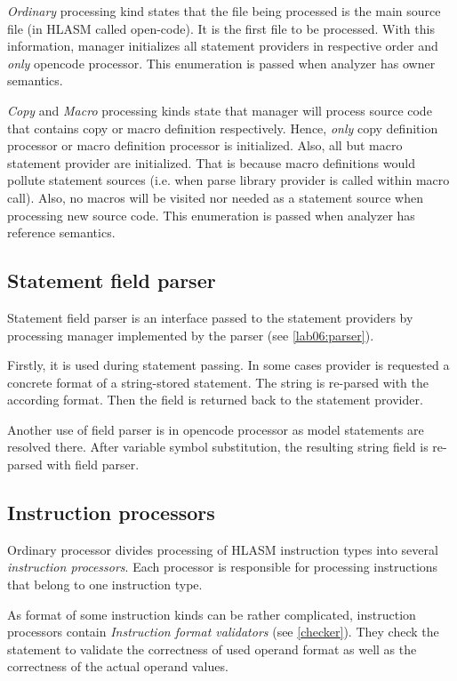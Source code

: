 \emph{Ordinary} processing kind states that the file being processed is the main source file (in HLASM called open-code). It is the first file to be processed. With this information, manager initializes all statement providers in respective order and \emph{only} opencode processor. This enumeration is passed when analyzer has owner semantics.

\emph{Copy} and \emph{Macro} processing kinds state that manager will process source code that contains copy or macro definition respectively. Hence, \emph{only} copy definition processor or macro definition processor is initialized. Also, all but macro statement provider are initialized. That is because macro definitions would pollute statement sources (i.e. when parse library provider is called within macro call). Also, no macros will be visited nor needed as a statement source when processing new source code. This enumeration is passed when analyzer has reference semantics.


\subsection{Statement field parser}
\label{lab06:field_parser}
Statement field parser is an interface passed to the statement providers by processing manager implemented by the parser (see \cref{lab06:parser}).

Firstly, it is used during statement passing. In some cases provider is requested a concrete format of a string-stored statement. The string is re-parsed with the according format. Then the field is returned back to the statement provider. 

Another use of field parser is in opencode processor as model statements are resolved there. After variable symbol substitution, the resulting string field is re-parsed with field parser.

\subsection{Instruction processors}
\label{lab06:instr_proc}
Ordinary processor divides processing of HLASM instruction types into several \emph{instruction processors}. Each processor is responsible for processing instructions that belong to one instruction type.

As format of some instruction kinds can be rather complicated, instruction processors contain \emph{Instruction format validators} (see \cref{checker}). They check the statement to validate the correctness of used operand format as well as the correctness of the actual operand values.

